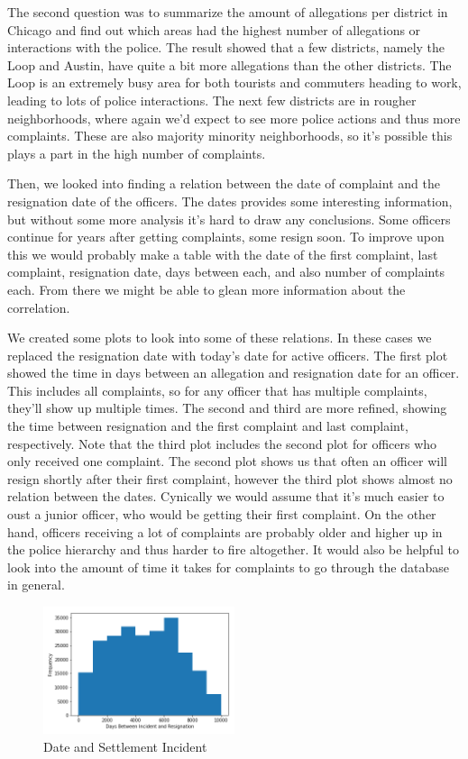 \documentclass[11pt]{article}
\begin{document}
The second question was to summarize the amount of allegations per district in Chicago and find out which areas had the highest number of allegations or interactions with the police. The result showed that a few districts, namely the Loop and Austin, have quite a bit more allegations than the other districts. The Loop is an extremely busy area for both tourists and commuters heading to work, leading to lots of police interactions. The next few districts are in rougher neighborhoods, where again we’d expect to see more police actions and thus more complaints. These are also majority minority neighborhoods, so it’s possible this plays a part in the high number of complaints.

Then, we looked into finding a relation between the date of complaint and the resignation date of the officers. The dates provides some interesting information, but without some more analysis it’s hard to draw any conclusions. Some officers continue for years after getting complaints, some resign soon. To improve upon this we would probably make a table with the date of the first complaint, last complaint, resignation date, days between each, and also number of complaints each. From there we might be able to glean more information about the correlation.

We created some plots to look into some of these relations. In these cases we replaced the resignation date with today’s date for active officers. The first plot showed the time in days between an allegation and resignation date for an officer. This includes all complaints, so for any officer that has multiple complaints, they’ll show up multiple times. The second and third are more refined, showing the time between resignation and the first complaint and last complaint, respectively. Note that the third plot includes the second plot for officers who only received one complaint. The second plot shows us that often an officer will resign shortly after their first complaint, however the third plot shows almost no relation between the dates. Cynically we would assume that it’s much easier to oust a junior officer, who would be getting their first complaint. On the other hand, officers receiving a lot of complaints are probably older and higher up in the police hierarchy and thus harder to fire altogether. It would also be helpful to look into the amount of time it takes for complaints to go through the database in general. 

\begin{figure}[h!]
\centering
\caption{Date and Settlement Incident}
\includegraphics[width=0.5\textwidth]{complaint1.png}
\end{figure}
\end{document}
